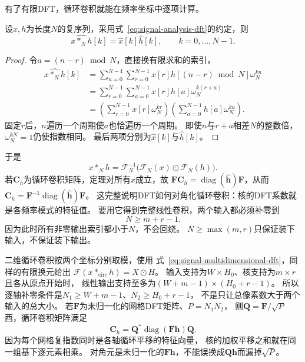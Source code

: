 有了有限DFT，循环卷积就能在频率坐标中逐项计算。
\begin{theorem}[离散循环卷积定理]
  \label{thm:signal-analysis-circular-convolution-theorem}
  设$x,h$为长度$N$的复序列，采用式~\eqref{eq:signal-analysis-dft}的约定，则
  \[
    \widehat{x*_Nh}[k]=\widehat x[k]\widehat h[k],\qquad k=0,\ldots,N-1.
  \]
\end{theorem}
\begin{proof}
  令$a=(n-r)\bmod N$，直接换有限求和的索引，
  \begin{align*}
    \widehat{x*_Nh}[k]
    &=\sum_{n=0}^{N-1}\sum_{r=0}^{N-1}
      x[r]h[(n-r)\bmod N]\omega_N^{kn}\\
    &=\sum_{r=0}^{N-1}\sum_{a=0}^{N-1}
      x[r]h[a]\omega_N^{k(r+a)}\\
    &=\left(\sum_{r=0}^{N-1}x[r]\omega_N^{kr}\right)
      \left(\sum_{a=0}^{N-1}h[a]\omega_N^{ka}\right).
  \end{align*}
  固定$r$后，$n$遍历一个周期使$a$也恰遍历一个周期。
  即使$n$与$r+a$相差$N$的整数倍，$\omega_N^{kN}=1$仍使指数相同。
  最后两项分别为$\widehat x[k]$与$\widehat h[k]$。
\end{proof}
于是
\begin{equation}
  x*_Nh=\mathcal F_N^{-1}\bigl(\mathcal F_N(x)\odot\mathcal F_N(h)\bigr).
  \label{eq:signal-analysis-frequency-domain-convolution}
\end{equation}
\BookEquationAliases{\label{eq:cnn-fft-convolution}
\label{eq:cnn-convolution-theorem-derivation}}
若$\bm C_h$为循环卷积矩阵，定理对所有$x$成立，故
$\bm F\bm C_h=\operatorname{diag}(\widehat{\bm h})\bm F$，从而
$\bm C_h=\bm F^{-1}\operatorname{diag}(\widehat{\bm h})\bm F$。
这完整说明DFT如何对角化循环卷积：核的DFT系数就是各频率模式的特征值。
要用它得到完整线性卷积，两个输入都必须补零到
\begin{equation}
  N\geq m+r-1.
  \label{eq:signal-analysis-linear-padding-condition}
\end{equation}
因为此时所有非零输出索引都小于$N$，不会回绕。
$N\geq\max(m,r)$只保证装下输入，不保证装下输出。

二维循环卷积按两个坐标分别取模，使用
式~\eqref{eq:signal-multidimensional-dft}，同样的有限换元给出
$\mathcal F(x*_{\mathrm{circ}}h)=X\odot H$。
输入支持为$W\times H_0$、核支持为$m\times r$且各从原点开始时，
线性输出支持至多为$(W+m-1)\times(H_0+r-1)$。
所以逐轴补零条件是$N_1\geq W+m-1$、$N_2\geq H_0+r-1$，
不是只让总像素数大于两个输入的总大小。
若$\bm F$为未归一化的网格DFT矩阵、$P=N_1N_2$，
则$\bm Q=\bm F/\sqrt P$酉，循环卷积矩阵满足
\begin{equation}
 \bm C_h=\bm Q^*\operatorname{diag}(\bm F\bm h)\bm Q.
 \label{eq:signal-multidimensional-circulant}
\end{equation}
因为每个网格复指数同时是各轴循环平移的特征向量，
核的加权平移之和就在同一组基下逐元素相乘。
对角元是未归一化的$\bm F\bm h$，不能误换成$\bm Q\bm h$而漏掉$\sqrt P$。

